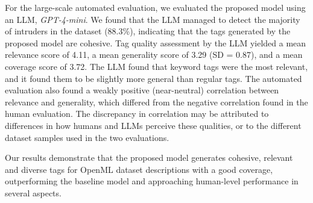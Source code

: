For the large-scale automated evaluation, we evaluated the proposed model using an LLM, \textit{GPT-4-mini}. We found that the LLM managed to detect the majority of intruders in the dataset (88.3\%), indicating that the tags generated by the proposed model are cohesive. Tag quality assessment by the LLM yielded a mean relevance score of 4.11, a mean generality score of 3.29 (SD = 0.87), and a mean coverage score of 3.72. The LLM found that keyword tags were the most relevant, and it found them to be slightly more general than regular tags. The automated evaluation also found a weakly positive (near-neutral) correlation between relevance and generality, which differed from the negative correlation found in the human evaluation. The discrepancy in correlation may be attributed to differences in how humans and LLMs perceive these qualities, or to the different dataset samples used in the two evaluations.

Our results demonstrate that the proposed model generates cohesive, relevant and diverse tags for OpenML dataset descriptions with a good coverage, outperforming the baseline model and approaching human-level performance in several aspects.